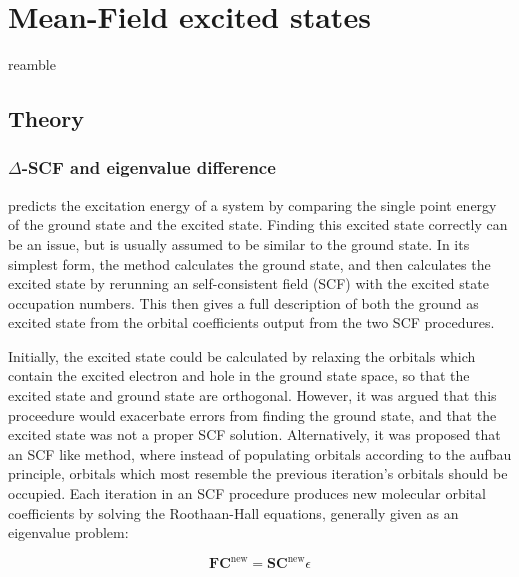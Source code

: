 %
%
\let\textcircled=\pgftextcircled
\chapter{Mean-Field excited states}
\label{chap:dscf}

reamble

\section{Theory}
\label{sec:dscf_theory}

\subsection{$\Delta$-SCF and eigenvalue difference}
\label{subsec{dscf_and_eigdiff}}

\dscf predicts the excitation energy of a system by comparing the single point
energy of the ground state and the excited state. Finding this excited state
correctly can be an issue, but is usually assumed to be similar to the ground
state. In its simplest form, the \dscf method calculates the ground state, and
then calculates the excited state by rerunning an self-consistent field (SCF) 
with the excited state occupation numbers. This then gives a full description 
of both the ground as excited state from the orbital coefficients output from 
the two SCF procedures.

Initially, the excited state could be calculated by relaxing the orbitals which
contain the excited electron and hole in the ground state space, so that the
excited state and ground state are orthogonal\cite{Hunt1969}. However, it was
argued that this proceedure would exacerbate errors from finding the ground
state, and that the excited state was not a proper SCF solution\cite{Gilbert2008}.
Alternatively, it was proposed that an SCF like method, where instead of
populating orbitals according to the aufbau principle, orbitals which most
resemble the previous iteration's orbitals should be occupied. Each iteration 
in an SCF procedure produces new molecular orbital coefficients by solving the 
Roothaan-Hall equations\cite{Roothaan1951}, generally given as an eigenvalue problem:

\begin{equation}
\mathbf{F} \mathbf{C}^{\text{new}} = \mathbf{S} \mathbf{C}^{\text{new}} \epsilon
\end{equation}

